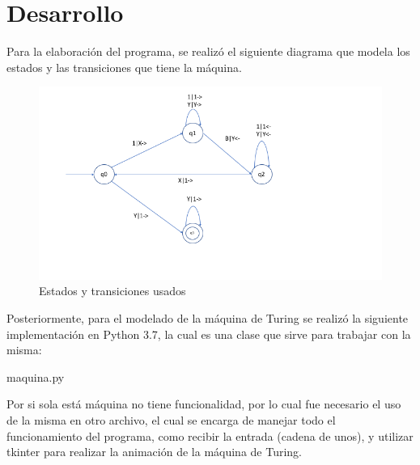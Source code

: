 \section{Desarrollo}
	Para la elaboración del programa, se realizó el siguiente diagrama que modela los estados y las transiciones que tiene la máquina.

	\begin{figure}[H]
		\begin{center}
			\includegraphics[scale=.4]{img/maquina.png}
			\caption{Estados y transiciones usados}
			\label{fig:maquina}
		\end{center}
	\end{figure}

	Posteriormente, para el modelado de la máquina de Turing se realizó la siguiente implementación en Python 3.7, la cual es una clase que sirve para trabajar con la misma:

	maquina.py
	

	Por si sola está máquina no tiene funcionalidad, por lo cual fue necesario el uso de la misma en otro archivo, el cual se encarga de manejar todo el funcionamiento del programa, como recibir la entrada (cadena de unos), y utilizar tkinter para realizar la animación de la máquina de Turing.
	
